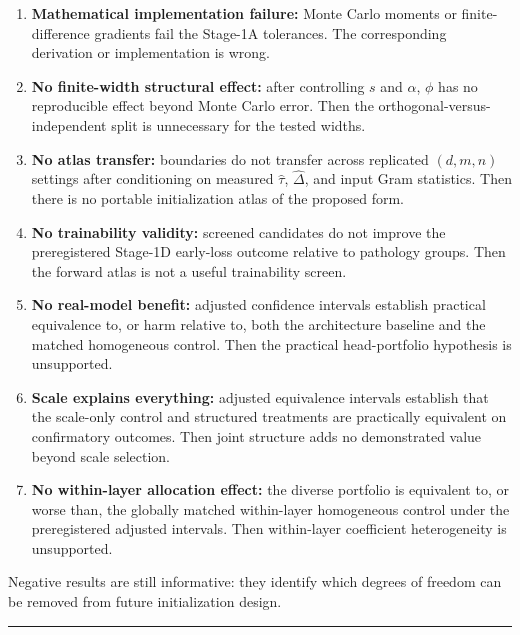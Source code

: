 \documentclass[11pt,letterpaper]{article}
\theoremstyle{definition}
\begin{document}
\begin{enumerate}
  \item \textbf{Mathematical implementation failure:} Monte Carlo moments or finite-difference gradients fail the Stage-1A tolerances. The corresponding derivation or implementation is wrong.
  \item \textbf{No finite-width structural effect:} after controlling $s$ and $\alpha$, $\phi$ has no reproducible effect beyond Monte Carlo error. Then the orthogonal-versus-independent split is unnecessary for the tested widths.
  \item \textbf{No atlas transfer:} boundaries do not transfer across replicated $(d,m,n)$ settings after conditioning on measured $\widehat\tau$, $\widehat\Delta$, and input Gram statistics. Then there is no portable initialization atlas of the proposed form.
  \item \textbf{No trainability validity:} screened candidates do not improve the preregistered Stage-1D early-loss outcome relative to pathology groups. Then the forward atlas is not a useful trainability screen.
  \item \textbf{No real-model benefit:} adjusted confidence intervals establish practical equivalence to, or harm relative to, both the architecture baseline and the matched homogeneous control. Then the practical head-portfolio hypothesis is unsupported.
  \item \textbf{Scale explains everything:} adjusted equivalence intervals establish that the scale-only control and structured treatments are practically equivalent on confirmatory outcomes. Then joint structure adds no demonstrated value beyond scale selection.
  \item \textbf{No within-layer allocation effect:} the diverse portfolio is equivalent to, or worse than, the globally matched within-layer homogeneous control under the preregistered adjusted intervals. Then within-layer coefficient heterogeneity is unsupported.
\end{enumerate}
Negative results are still informative: they identify which degrees of freedom can be removed from future initialization design.

\vspace{0.35em}\hrule\vspace{0.35em}
\end{document}

